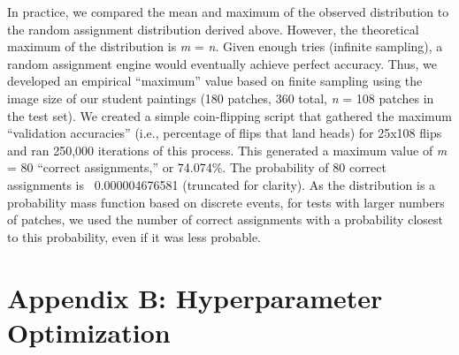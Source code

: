 \documentclass[11pt]{article}
\begin{document}
In practice, we compared the mean and maximum of the observed distribution to the random assignment distribution derived above. However, the theoretical maximum of the distribution is \textit{m} = \textit{n}. Given enough tries (infinite sampling), a random assignment engine would eventually achieve perfect accuracy. Thus, we developed an empirical “maximum” value based on finite sampling using the image size of our student paintings (180 patches, 360 total, \textit{n} = 108 patches in the test set). We created a simple coin-flipping script that gathered the maximum “validation accuracies” (i.e., percentage of flips that land heads) for 25x108 flips and ran 250,000 iterations of this process. This generated a maximum value of \textit{m} = 80 “correct assignments,” or 74.074\%. The probability of 80 correct assignments is ~0.000004676581 (truncated for clarity). As the distribution is a probability mass function based on discrete events, for tests with larger numbers of patches, we used the number of correct assignments with a probability closest to this probability, even if it was less probable. 

\section*{\selectfont Appendix B: Hyperparameter Optimization}
\end{document}
